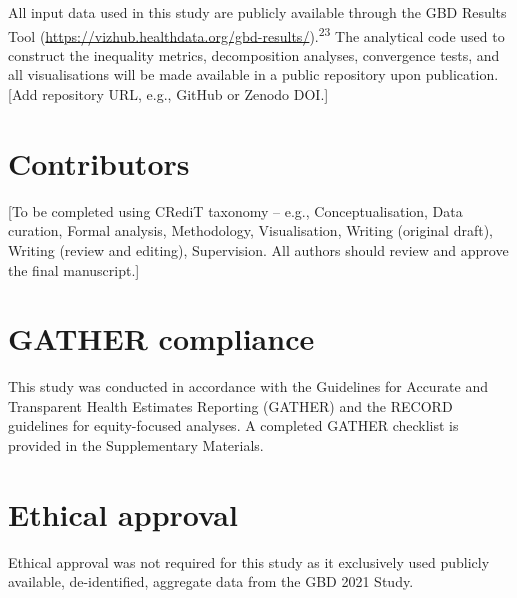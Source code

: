 \documentclass[12pt]{article}
\begin{document}
All input data used in this study are publicly available through the GBD Results Tool (\url{https://vizhub.healthdata.org/gbd-results/}).\textsuperscript{23} The analytical code used to construct the inequality metrics, decomposition analyses, convergence tests, and all visualisations will be made available in a public repository upon publication. [Add repository URL, e.g., GitHub or Zenodo DOI.]

\section*{Contributors}

[To be completed using CRediT taxonomy -- e.g., Conceptualisation, Data curation, Formal analysis, Methodology, Visualisation, Writing (original draft), Writing (review and editing), Supervision. All authors should review and approve the final manuscript.]

\section*{GATHER compliance}

This study was conducted in accordance with the Guidelines for Accurate and Transparent Health Estimates Reporting (GATHER) and the RECORD guidelines for equity-focused analyses. A completed GATHER checklist is provided in the Supplementary Materials.

\section*{Ethical approval}

Ethical approval was not required for this study as it exclusively used publicly available, de-identified, aggregate data from the GBD 2021 Study.
\end{document}
